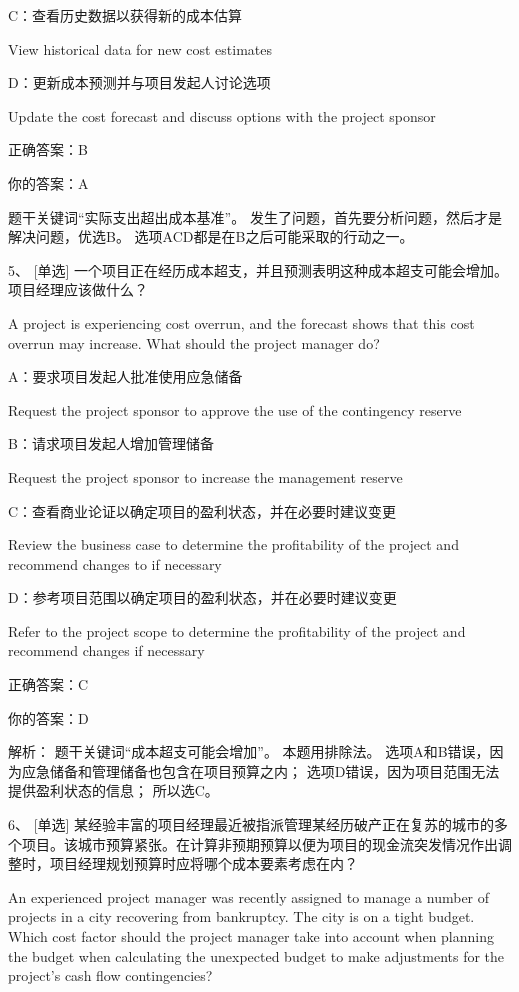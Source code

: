 C：查看历史数据以获得新的成本估算

View historical data for new cost estimates

D：更新成本预测并与项目发起人讨论选项

Update the cost forecast and discuss options with the project sponsor

正确答案：B

你的答案：A


题干关键词“实际支出超出成本基准”。 发生了问题，首先要分析问题，然后才是解决问题，优选B。 选项ACD都是在B之后可能采取的行动之一。



5、 [单选] 一个项目正在经历成本超支，并且预测表明这种成本超支可能会增加。项目经理应该做什么？

A project is experiencing cost overrun, and the forecast shows that this cost overrun may increase. What should the project manager do?

A：要求项目发起人批准使用应急储备

Request the project sponsor to approve the use of the contingency reserve

B：请求项目发起人增加管理储备

Request the project sponsor to increase the management reserve

C：查看商业论证以确定项目的盈利状态，并在必要时建议变更

Review the business case to determine the profitability of the project and recommend changes to if necessary

D：参考项目范围以确定项目的盈利状态，并在必要时建议变更

Refer to the project scope to determine the profitability of the project and recommend changes if necessary

正确答案：C

你的答案：D

解析： 题干关键词“成本超支可能会增加”。 本题用排除法。 选项A和B错误，因为应急储备和管理储备也包含在项目预算之内； 选项D错误，因为项目范围无法提供盈利状态的信息； 所以选C。



6、 [单选] 某经验丰富的项目经理最近被指派管理某经历破产正在复苏的城市的多个项目。该城市预算紧张。在计算非预期预算以便为项目的现金流突发情况作出调整时，项目经理规划预算时应将哪个成本要素考虑在内？

An experienced project manager was recently assigned to manage a number of projects in a city recovering from bankruptcy. The city is on a tight budget. Which cost factor should the project manager take into account when planning the budget when calculating the unexpected budget to make adjustments for the project's cash flow contingencies?

